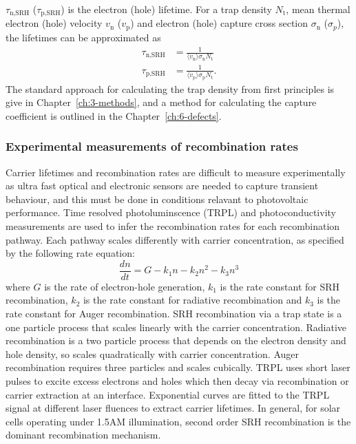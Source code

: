 $\tau_\textrm{n,SRH}$ ($\tau_\textrm{p,SRH}$) is the electron (hole) lifetime. For a trap density $N_\mathrm{t}$, mean thermal electron (hole) velocity $v_\mathrm{n
}$ ($v_\mathrm{p}$) and electron (hole) capture cross section $\sigma_\mathrm{n}$ ($\sigma_p$), the lifetimes can be approximated as 
\begin{align}
\tau_\textrm{n,SRH} &= \frac{1}{\langle v_\mathrm{n}\rangle\sigma_\mathrm{n}N_\mathrm{t}} \\
\tau_\textrm{p,SRH} &= \frac{1}{\langle v_\mathrm{p}\rangle\sigma_\mathrm{p}N_\mathrm{t}}.
\end{align}
The standard approach for calculating the trap density from first principles is give in Chapter\ \ref{ch:3-methods}, and a method for calculating the capture coefficient is outlined in the Chapter\ \ref{ch:6-defects}.

\subsubsection{Experimental measurements of recombination rates} \label{exprecombo}

Carrier lifetimes and recombination rates are difficult to measure experimentally as ultra fast optical and electronic sensors are needed to capture transient behaviour, and this must be done in conditions relavant to photovoltaic performance. Time resolved photoluminscence (TRPL) and photoconductivity measurements are used to infer the recombination rates for each recombination pathway.
Each pathway scales differently with carrier concentration, as specified by the following rate equation:\autocite{Herz2016}
\begin{equation}
\frac{d n}{d t} = G -k_1n -k_2n^2 -k_3n^3 
\end{equation}
where $G$ is the rate of electron-hole generation, $k_1$ is the rate constant for SRH recombination, $k_2$ is the rate constant for radiative recombination and $k_3$ is the rate constant for Auger recombination. SRH recombination via a trap state is a one particle process that scales linearly with the carrier concentration. Radiative recombination is a two particle process that depends on the electron density and hole density, so scales quadratically with carrier concentration. Auger recombination requires three particles and scales cubically.
TRPL uses short laser pulses to excite excess electrons and holes which then decay via recombination or carrier extraction at an interface. Exponential curves are fitted to the TRPL signal at different laser fluences to extract carrier lifetimes. In general, for solar cells operating under 1.5AM illumination, second order SRH recombination is the dominant recombination mechanism.


